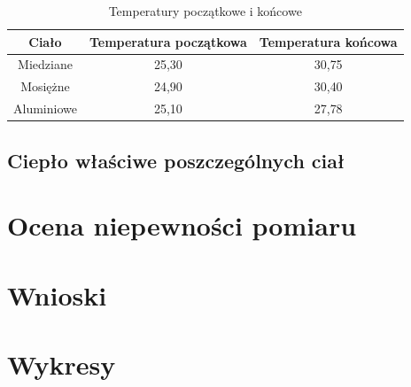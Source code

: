 \documentclass[a4paper,12pt]{article}
\begin{document}
\begin{table}[h]
    \centering
    \begin{tabular}{|c|c|c|}
        \hline
        \textbf{Ciało} & \textbf{Temperatura początkowa} & \textbf{Temperatura końcowa} \\
        \hline
        Miedziane & 25{,}30 & 30{,}75 \\
        \hline
        Mosiężne & 24{,}90 & 30{,}40 \\
        \hline
        Aluminiowe & 25{,}10 & 27{,}78 \\
        \hline
    \end{tabular}
    \caption{Temperatury początkowe i końcowe}
    \label{tab:temperatury}
\end{table}





\subsection{Ciepło właściwe poszczególnych ciał}

\section{Ocena niepewności pomiaru}

\section{Wnioski}


\newpage

\section{Wykresy}
\end{document}
